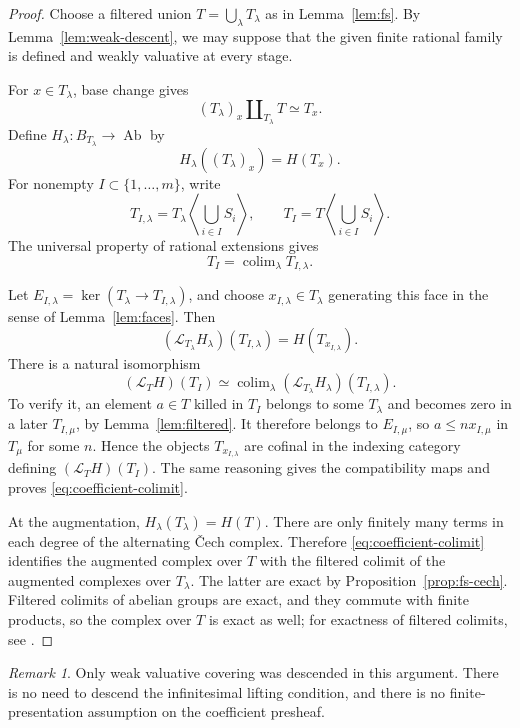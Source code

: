 \documentclass[11pt]{article}
\theoremstyle{definition}
\theoremstyle{remark}
\newtheorem{remark}[theorem]{Remark}
\DeclareMathOperator{\colim}{colim}
\DeclareMathOperator{\Ab}{Ab}
\newcommand{\LL}{\mathcal L}
\begin{document}
\begin{proof}
Choose a filtered union \(T=\bigcup_\lambda T_\lambda\) as in
Lemma~\ref{lem:fs}. By Lemma~\ref{lem:weak-descent}, we may suppose
that the given finite rational family is defined and weakly
valuative at every stage.

For \(x\in T_\lambda\), base change gives
\[
(T_\lambda)_x\amalg_{T_\lambda}T\simeq T_x.
\]
Define \(H_\lambda:B_{T_\lambda}\to\Ab\) by
\[
H_\lambda((T_\lambda)_x)=H(T_x).
\]
For nonempty \(I\subset\{1,\ldots,m\}\), write
\[
T_{I,\lambda}
=T_\lambda\left\langle\bigcup_{i\in I}S_i\right\rangle,
\qquad
T_I=T\left\langle\bigcup_{i\in I}S_i\right\rangle.
\]
The universal property of rational extensions gives
\[
T_I=\colim_\lambda T_{I,\lambda}.
\]

Let \(E_{I,\lambda}=\ker(T_\lambda\to T_{I,\lambda})\), and choose
\(x_{I,\lambda}\in T_\lambda\) generating this face in the sense
of Lemma~\ref{lem:faces}. Then
\[
(\LL_{T_\lambda}H_\lambda)(T_{I,\lambda})
=H(T_{x_{I,\lambda}}).
\]
There is a natural isomorphism
\begin{equation}\label{eq:coefficient-colimit}
(\LL_TH)(T_I)
\simeq
\colim_\lambda
(\LL_{T_\lambda}H_\lambda)(T_{I,\lambda}).
\end{equation}
To verify it, an element \(a\in T\) killed in \(T_I\) belongs to
some \(T_\lambda\) and becomes zero in a later
\(T_{I,\mu}\), by Lemma~\ref{lem:filtered}. It therefore belongs
to \(E_{I,\mu}\), so \(a\le n x_{I,\mu}\) in \(T_\mu\) for some
\(n\). Hence the objects \(T_{x_{I,\lambda}}\) are cofinal in
the indexing category defining \((\LL_TH)(T_I)\).
The same reasoning gives the compatibility maps and proves
\eqref{eq:coefficient-colimit}.

At the augmentation,
\(H_\lambda(T_\lambda)=H(T)\).
There are only finitely many terms in each degree of the
alternating \v{C}ech complex. Therefore
\eqref{eq:coefficient-colimit} identifies the augmented complex
over \(T\) with the filtered colimit of the augmented complexes
over \(T_\lambda\).
The latter are exact by Proposition~\ref{prop:fs-cech}.
Filtered colimits of abelian groups are exact, and they commute
with finite products, so the complex over \(T\) is exact as well;
for exactness of filtered colimits, see
\cite[Tag~00DB]{Stacks}.
\end{proof}

\begin{remark}
Only weak valuative covering was descended in this argument.
There is no need to descend the infinitesimal lifting condition,
and there is no finite-presentation assumption on the coefficient
presheaf.
\end{remark}
\end{document}

